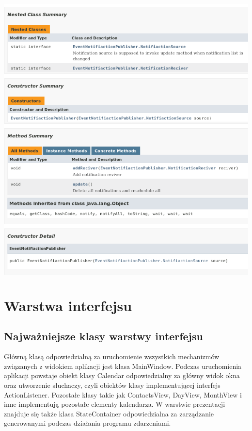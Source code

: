 \documentclass[a4paper,12pt]{article}
\begin{document}
\begin{minipage}{\textwidth}

    \includegraphics[width=\textwidth]{./screen/logicLayer/EventNotificationPublisher.png}
    \label{LogicLayerFactory}

\end{minipage}

\section{Warstwa interfejsu}
\subsection{Najważniejsze klasy warstwy interfejsu}
Główną klasą odpowiedzialną za uruchomienie wszystkich mechanizmów związanych z widokiem aplikacji jest klasa MainWindow.
Podczas uruchomienia aplikacji powstaje obiekt klasy Calendar odpowiedzialny za główny widok okna oraz utworzenie słuchaczy, czyli obiektów klasy implementującej interfejs ActionListener. Pozostałe klasy takie jak ContactsView, DayView, MonthView i inne implementują pozostałe elementy kalendarza.
W warstwie prezentacji znajduje się także klasa StateContainer odpowiedzialna za zarządzanie  generowanymi podczas działania programu zdarzeniami.
\end{document}
